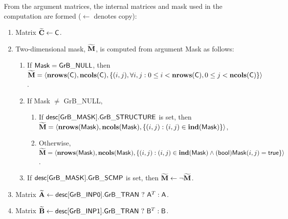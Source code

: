 From the argument matrices, the internal matrices and mask used in 
the computation are formed ($\leftarrow$ denotes copy):
\begin{enumerate}
	\item Matrix ${\bf \widetilde{C}} \leftarrow {\sf C}$.

	\item Two-dimensional mask, ${\bf \widetilde{M}}$, is computed from
    argument {\sf Mask} as follows:
	\begin{enumerate}
		\item If ${\sf Mask} = {\sf GrB\_NULL}$, then ${\bf \widetilde{M}} = 
        \langle \bold{nrows}({\sf C}), \bold{ncols}({\sf C}), \{(i,j), 
        \forall i,j : 0 \leq i <  \bold{nrows}({\sf C}), 0 \leq j < 
        \bold{ncols}({\sf C}) \} \rangle$.

		\item If {\sf Mask} $\ne$ {\sf GrB\_NULL},
        \begin{enumerate}
            \item If ${\sf desc[GrB\_MASK].GrB\_STRUCTURE}$ is set, then 
            ${\bf \widetilde{M}} = \langle \bold{nrows}({\sf Mask}), 
            \bold{ncols}({\sf Mask}), \{(i,j) : (i,j) \in \bold{ind}({\sf Mask}) \} \rangle$,
            \item Otherwise, ${\bf \widetilde{M}} = \langle \bold{nrows}({\sf Mask}), 
            \bold{ncols}({\sf Mask}), \\ \{(i,j) : (i,j) \in \bold{ind}({\sf Mask}) \wedge 
            ({\sf bool}){\sf Mask}(i,j) = {\sf true}\} \rangle$.
        \end{enumerate}

		\item	If ${\sf desc[GrB\_MASK].GrB\_SCMP}$ is set, then 
        ${\bf \widetilde{M}} \leftarrow \neg {\bf \widetilde{M}}$.
	\end{enumerate}

	\item Matrix ${\bf \widetilde{A}} \leftarrow
    {\sf desc[GrB\_INP0].GrB\_TRAN} \ ? \ {\sf A}^T : {\sf A}$.

	\item Matrix ${\bf \widetilde{B}} \leftarrow
    {\sf desc[GrB\_INP1].GrB\_TRAN} \ ? \ {\sf B}^T : {\sf B}$.
\end{enumerate}

